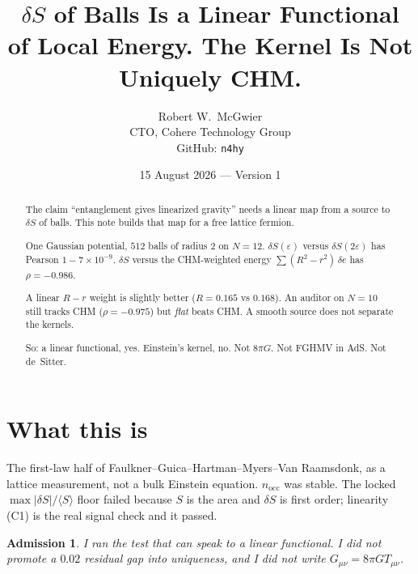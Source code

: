 \documentclass[11pt]{article}
\title{\textbf{$\delta S$ of Balls Is a Linear Functional\\
of Local Energy. The Kernel Is Not Uniquely CHM.}}
\author{Robert W.\ McGwier\\
\small CTO, Cohere Technology Group\\
\small GitHub: \texttt{n4hy}}
\date{15 August 2026 --- Version 1}
\newtheorem*{admission}{Admission}
\begin{document}
\maketitle

\begin{abstract}
\noindent
The claim ``entanglement gives linearized gravity'' needs a
linear map from a source to $\delta S$ of balls. This note
builds that map for a free lattice fermion.

One Gaussian potential, $512$ balls of radius $2$ on $N=12$.
$\delta S(\varepsilon)$ versus $\delta S(2\varepsilon)$ has
Pearson $1-7\times 10^{-9}$. $\delta S$ versus the CHM-weighted
energy $\sum (R^2-r^2)\,\delta e$ has $\rho=-0.986$.

A linear $R-r$ weight is slightly better ($R=0.165$ vs $0.168$).
An auditor on $N=10$ still tracks CHM ($\rho=-0.975$) but
\emph{flat} beats CHM. A smooth source does not separate the
kernels.

So: a linear functional, yes. Einstein's kernel, no.
Not $8\pi G$. Not FGHMV in AdS. Not de~Sitter.
\end{abstract}

\section{What this is}

The first-law half of Faulkner--Guica--Hartman--Myers--Van
Raamsdonk, as a lattice measurement, not a bulk Einstein
equation. $n_{\mathrm{occ}}$ was stable. The locked
$\max|\delta S|/\langle S\rangle$ floor failed because $S$ is
the area and $\delta S$ is first order; linearity (C1) is the
real signal check and it passed.

\begin{admission}
I ran the test that can speak to a linear functional. I did
not promote a $0.02$ residual gap into uniqueness, and I did
not write $G_{\mu\nu}=8\pi GT_{\mu\nu}$.
\end{admission}
\end{document}
